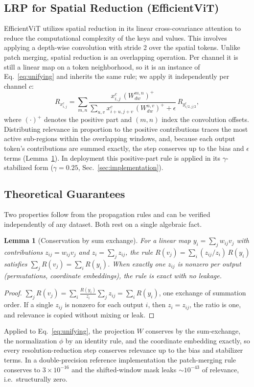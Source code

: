 \documentclass[lettersize,journal]{IEEEtran}
\newtheorem{lemma}{Lemma}
\begin{document}
\subsection{LRP for Spatial Reduction (EfficientViT)}
EfficientViT utilizes spatial reduction in its linear cross-covariance attention to reduce the computational complexity of the keys and values. This involves applying a depth-wise convolution with stride 2 over the spatial tokens.
Unlike patch merging, spatial reduction is an overlapping operation. Per channel it is still a linear map on a token neighborhood, so it is an instance of Eq.~\eqref{eq:unifying} and inherits the same rule; we apply it independently per channel $c$:
\begin{equation}
R_{x_{i,j}^c} = \sum_{m,n} \frac{x_{i,j}^c\,(W_{dw}^{m,n})^{+}}{\sum_{u,v} x_{i+u,j+v}^c\,(W_{dw}^{u,v})^{+} + \epsilon}\, R_{y_{i/2,j/2}^c},
\end{equation}
where $(\cdot)^{+}$ denotes the positive part and $(m,n)$ index the convolution offsets. Distributing relevance in proportion to the positive contributions traces the most active sub-regions within the overlapping windows, and, because each output token's contributions are summed exactly, the step conserves up to the bias and $\epsilon$ terms (Lemma~\ref{lem:conservation}). In deployment this positive-part rule is applied in its $\gamma$-stabilized form ($\gamma{=}0.25$, Sec.~\ref{sec:implementation}).

\subsection{Theoretical Guarantees}
\label{sec:guarantees}
Two properties follow from the propagation rules and can be verified independently of any dataset. Both rest on a single algebraic fact.

\begin{lemma}[Conservation by sum exchange]
\label{lem:conservation}
For a linear map $y_i=\sum_j w_{ij}v_j$ with contributions $z_{ij}=w_{ij}v_j$ and $z_i=\sum_j z_{ij}$, the rule $R(v_j)=\sum_i (z_{ij}/z_i)\,R(y_i)$ satisfies $\sum_j R(v_j)=\sum_i R(y_i)$. When exactly one $z_{ij}$ is nonzero per output (permutations, coordinate embeddings), the rule is exact with no leakage.
\end{lemma}
\begin{proof}
$\sum_j R(v_j)=\sum_i \tfrac{R(y_i)}{z_i}\sum_j z_{ij}=\sum_i R(y_i)$, one exchange of summation order. If a single $z_{ij}$ is nonzero for each output $i$, then $z_i=z_{ij}$, the ratio is one, and relevance is copied without mixing or leak.
\end{proof}
Applied to Eq.~\eqref{eq:unifying}, the projection $W$ conserves by the sum-exchange, the normalization $\phi$ by an identity rule, and the coordinate embedding exactly, so every resolution-reduction step conserves relevance up to the bias and stabilizer terms. In a double-precision reference implementation the patch-merging rule conserves to $3\times10^{-16}$ and the shifted-window mask leaks $\sim10^{-43}$ of relevance, i.e.\ structurally zero.
\end{document}
